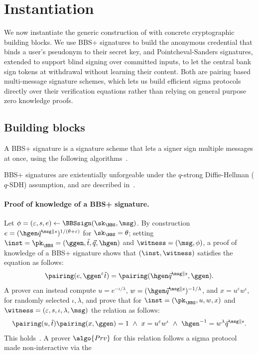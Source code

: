 \section{Instantiation}\label{sec:offline-instantiation}

We now instantiate the generic construction of 
with concrete cryptographic building blocks. We use BBS+ signatures to build
the anonymous credential that binds a user's pseudonym to their secret key, and
Pointcheval-Sanders signatures, extended to support blind signing over
committed inputs, to let the central bank sign tokens at withdrawal without
learning their content. Both are pairing based multi-message signature schemes,
which lets us build efficient sigma protocols directly over their verification
equations rather than relying on general purpose zero knowledge proofs.

\subsection{Building blocks}

A BBS+ signature is a signature scheme that lets a signer sign multiple
messages at once, using the following
algorithms~\cite{C:BonBoySha04,SCN:AuSusMu06,EPRINT:CamDriLeh16}.

BBS+ signatures are existentially unforgeable under the $q$-strong
Diffie-Hellman ($q$-SDH) assumption, and are described
in~.

\paragraph{Proof of knowledge of a BBS+ signature.}\label{sec:joint-proof}

Let $\phi = (\varepsilon, s, e) \gets \BBSsign(\sk_{\BBS}, \msg)$. By
construction $e = (\hgen \vec{q}^{\msg\|s})^{1/(\theta+\varepsilon)}$ for
$\sk_{\BBS} = \theta$; setting $\inst = \pk_{\BBS} = (\ggen, \tilde{t},
\vec{q}, \hgen)$ and $\witness = (\msg, \phi)$, a proof of knowledge of a BBS+
signature shows that $(\inst, \witness)$ satisfies the equation as follows:
%
\begin{equation*}
%
  \pairing(e, \ggen^\varepsilon \tilde{t}) = \pairing(\hgen \vec{q}^{\msg\|s},
  \ggen).
\end{equation*}
%
A prover can instead compute $u = e^{-\iota/\lambda}$, $w = (\hgen
\vec{q}^{\msg\|s})^{-1/\lambda}$, and $x = u^\varepsilon w^\iota$, for randomly
selected $\iota, \lambda$, and prove that for $\inst = (\pk_{\BBS}, u, w, x)$
and $\witness = (\varepsilon, s, \iota, \lambda, \msg)$ the relation as
follows:
%
\begin{align} \pairing(u, \tilde{t}) \pairing(x, \ggen) = 1 \ \wedge \ x =
u^\varepsilon w^\iota \ \wedge \ \hgen^{-1} = w^\lambda \vec{q}^{\msg\|s}.
\label{eq:BBSrel} \end{align}
%
This holds~\cite{EC:TesZhu23b}. A prover $\algo{Prv}$ for this relation follows
a sigma protocol made non-interactive via the

